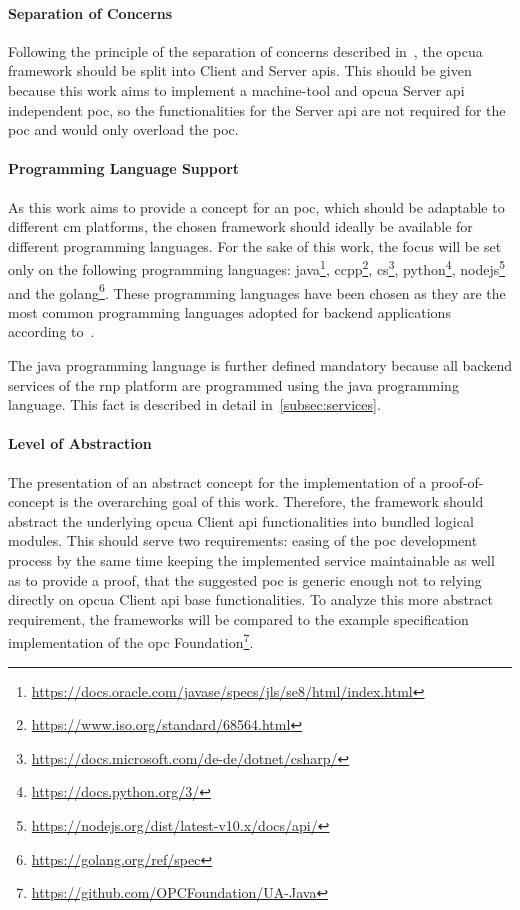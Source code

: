\documentclass[
a4paper,
twoside,
headsepline,
cleardoublepage=empty,
parskip=half,
draft=false
]{scrbook}
\begin{document}
			\paragraph{Separation of Concerns} Following the principle of the separation of concerns described in~\cite{hursch1995separation}, the \gls{opcua} framework should be split into Client and Server \gls{api}s.
			This should be given because this work aims to implement a machine-tool and \gls{opcua} Server \gls{api} independent \gls{poc}, so the functionalities for the Server \gls{api} are not required for the \gls{poc} and would only overload the \gls{poc}.
			
			\paragraph{Programming Language Support} As this work aims to provide a concept for an \gls{poc}, which should be adaptable to different \gls{cm} platforms, the chosen framework should ideally be available for different programming languages. 
			For the sake of this work, the focus will be set only on the following programming languages: \gls{java}\footnote{\url{https://docs.oracle.com/javase/specs/jls/se8/html/index.html}}, \gls{ccpp}\footnote{\url{https://www.iso.org/standard/68564.html}}, \gls{cs}\footnote{\url{https://docs.microsoft.com/de-de/dotnet/csharp/}}, \gls{python}\footnote{\url{https://docs.python.org/3/}}, \gls{nodejs}\footnote{\url{https://nodejs.org/dist/latest-v10.x/docs/api/}} and the \gls{golang}\footnote{\url{https://golang.org/ref/spec}}.
			These programming languages have been chosen as they are the most common programming languages adopted for backend applications according to~\cite{jain2017evolution}.
			
			The \gls{java} programming language is further defined mandatory because all backend services of the \gls{rnp} platform are programmed using the \gls{java} programming language.
			This fact is described in detail in~\cref{subsec:services}.
			
			\paragraph{Level of Abstraction} The presentation of an abstract concept for the implementation of a proof-of-concept is the overarching goal of this work. 
			Therefore, the framework should abstract the underlying \gls{opcua} Client \gls{api} functionalities into bundled logical modules. 
			This should serve two requirements: easing of the \gls{poc} development process by the same time  keeping the implemented service maintainable as well as to provide a proof, that the suggested \gls{poc} is generic enough not to relying directly on \gls{opcua} Client \gls{api} base functionalities. 
			To analyze this more abstract requirement, the frameworks will be compared to the example specification implementation of the \gls{opc} Foundation\footnote{\url{https://github.com/OPCFoundation/UA-Java}}. 
			
\end{document}
